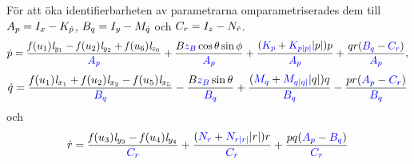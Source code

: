 \documentclass[11pt,aspectratio=169]{beamer}
\begin{document}
\begin{frame}[shrink]
\end{frame}

\begin{frame}[shrink]
För att öka identifierbarheten av parametrarna omparametriserades dem till $A_p = I_{x} - K_{\dot{p}}$, $B_q = I_{y} - M_{\dot{q}}$ och $C_r = I_{z} - N_{\dot{r}}$.
\begin{multline*}
\dot{p} = \frac{\mathit{f}(u_{1}) \mathit{l}_{y_{1}} - \mathit{f}(u_{2}) \mathit{l}_{y_{2}} + \mathit{f}(u_{6}) \mathit{l}_{z_{6}}}{{\color{blue}A_p}} + \frac{B {\color{blue}z_B} \cos{\theta} \sin{\phi}}{{\color{blue}A_p}} + \frac{({\color{blue}K_{p}} + {\color{blue}K_{p|p|}} |p|)p}{{\color{blue}A_p}} + \frac{q r ({\color{blue}B_q} - {\color{blue}C_r})}{{\color{blue}A_p}},
\end{multline*}
\begin{multline*} 
\dot{q} = \frac{\mathit{f}(u_{1}) \mathit{l}_{x_{1}} + \mathit{f}(u_{2}) \mathit{l}_{x_{2}} - \mathit{f}(u_{5}) \mathit{l}_{x_{5}}}{{\color{blue}B_q}} - \frac{B {\color{blue}z_B} \sin{\theta}}{{\color{blue}B_q}} + \frac{({\color{blue}M_{q}} + {\color{blue}M_{q|q|}} |q|)q}{{\color{blue}B_q}} - \frac{p r ({\color{blue}A_p} - {\color{blue}C_r})}{{\color{blue}B_q}}
\end{multline*}
och
\begin{multline*} 
\dot{r} = \frac{\mathit{f}(u_{3}) \mathit{l}_{y_{3}} - \mathit{f}(u_{4}) \mathit{l}_{y_{4}}}{{\color{blue}C_r}} + \frac{({\color{blue}N_{r}} + {\color{blue}N_{r|r|}} |r|)r}{{\color{blue}C_r}} + \frac{p q ({\color{blue}A_p}  -{\color{blue}B_q})}{{\color{blue}C_r}}
\end{multline*}
\end{frame}
\end{document}
